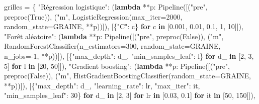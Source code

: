 \documentclass[
  10pt,
]{article}
\newenvironment{Shaded}{}{}
\newcommand{\ControlFlowTok}[1]{\textcolor[rgb]{0.00,0.44,0.13}{\textbf{#1}}}
\newcommand{\DecValTok}[1]{\textcolor[rgb]{0.25,0.63,0.44}{#1}}
\newcommand{\FloatTok}[1]{\textcolor[rgb]{0.25,0.63,0.44}{#1}}
\newcommand{\KeywordTok}[1]{\textcolor[rgb]{0.00,0.44,0.13}{\textbf{#1}}}
\newcommand{\NormalTok}[1]{#1}
\newcommand{\OperatorTok}[1]{\textcolor[rgb]{0.40,0.40,0.40}{#1}}
\newcommand{\StringTok}[1]{\textcolor[rgb]{0.25,0.44,0.63}{#1}}
\newcommand{\VariableTok}[1]{\textcolor[rgb]{0.10,0.09,0.49}{#1}}
\begin{document}
\begin{Shaded}
\begin{Highlighting}[]
\NormalTok{grilles }\OperatorTok{=}\NormalTok{ \{}
    \StringTok{"Régression logistique"}\NormalTok{: (}\KeywordTok{lambda} \OperatorTok{**}\NormalTok{p: Pipeline([(}\StringTok{"pre"}\NormalTok{, preproc(}\VariableTok{True}\NormalTok{)),}
\NormalTok{                              (}\StringTok{"m"}\NormalTok{, LogisticRegression(max\_iter}\OperatorTok{=}\DecValTok{2000}\NormalTok{, random\_state}\OperatorTok{=}\NormalTok{GRAINE, }\OperatorTok{**}\NormalTok{p))]),}
\NormalTok{                              [\{}\StringTok{"C"}\NormalTok{: c\} }\ControlFlowTok{for}\NormalTok{ c }\KeywordTok{in}\NormalTok{ [}\FloatTok{0.001}\NormalTok{, }\FloatTok{0.01}\NormalTok{, }\FloatTok{0.1}\NormalTok{, }\DecValTok{1}\NormalTok{, }\DecValTok{10}\NormalTok{]]),}
    \StringTok{"Forêt aléatoire"}\NormalTok{: (}\KeywordTok{lambda} \OperatorTok{**}\NormalTok{p: Pipeline([(}\StringTok{"pre"}\NormalTok{, preproc(}\VariableTok{False}\NormalTok{)),}
\NormalTok{                        (}\StringTok{"m"}\NormalTok{, RandomForestClassifier(n\_estimators}\OperatorTok{=}\DecValTok{300}\NormalTok{, random\_state}\OperatorTok{=}\NormalTok{GRAINE, n\_jobs}\OperatorTok{={-}}\DecValTok{1}\NormalTok{, }\OperatorTok{**}\NormalTok{p))]),}
\NormalTok{                        [\{}\StringTok{"max\_depth"}\NormalTok{: d\_, }\StringTok{"min\_samples\_leaf"}\NormalTok{: l\} }\ControlFlowTok{for}\NormalTok{ d\_ }\KeywordTok{in}\NormalTok{ [}\DecValTok{2}\NormalTok{, }\DecValTok{3}\NormalTok{, }\DecValTok{5}\NormalTok{] }\ControlFlowTok{for}\NormalTok{ l }\KeywordTok{in}\NormalTok{ [}\DecValTok{20}\NormalTok{, }\DecValTok{50}\NormalTok{]]),}
    \StringTok{"Gradient boosting"}\NormalTok{: (}\KeywordTok{lambda} \OperatorTok{**}\NormalTok{p: Pipeline([(}\StringTok{"pre"}\NormalTok{, preproc(}\VariableTok{False}\NormalTok{)),}
\NormalTok{                          (}\StringTok{"m"}\NormalTok{, HistGradientBoostingClassifier(random\_state}\OperatorTok{=}\NormalTok{GRAINE, }\OperatorTok{**}\NormalTok{p))]),}
\NormalTok{                          [\{}\StringTok{"max\_depth"}\NormalTok{: d\_, }\StringTok{"learning\_rate"}\NormalTok{: lr, }\StringTok{"max\_iter"}\NormalTok{: it, }\StringTok{"min\_samples\_leaf"}\NormalTok{: }\DecValTok{30}\NormalTok{\}}
                           \ControlFlowTok{for}\NormalTok{ d\_ }\KeywordTok{in}\NormalTok{ [}\DecValTok{2}\NormalTok{, }\DecValTok{3}\NormalTok{] }\ControlFlowTok{for}\NormalTok{ lr }\KeywordTok{in}\NormalTok{ [}\FloatTok{0.03}\NormalTok{, }\FloatTok{0.1}\NormalTok{] }\ControlFlowTok{for}\NormalTok{ it }\KeywordTok{in}\NormalTok{ [}\DecValTok{50}\NormalTok{, }\DecValTok{150}\NormalTok{]]),}

\end{Highlighting}
\end{Shaded}
\end{document}
